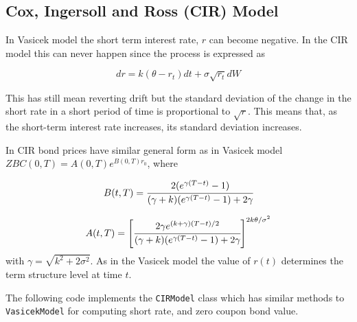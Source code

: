 \subsection{Cox, Ingersoll and Ross (CIR) Model}
\label{cox-ingersoll-and-ross-cir-model}

In Vasicek model the short term interest rate, $r$ can become negative. In the CIR model this can never happen since the process is expressed as

\begin{equation}
dr = k(\theta - r_t)dt + \sigma\sqrt{r_t}dW
\label{eq:cir_process}
\end{equation}

This has still mean reverting drift but the standard deviation of the change in the short rate in a short period of time is proportional to $\sqrt{r}$. This means that, as the short-term interest rate increases, its standard deviation increases.

In CIR bond prices have similar general form as in Vasicek model $ZBC(0, T)=A(0, T)e^{B(0, T)r_0}$, where

\begin{equation}
B(t, T) = \cfrac{2(e^{\gamma(T-t)}-1)}{(\gamma+k)(e^{\gamma(T-t)}-1)+2\gamma}
\label{eq:cir_B_param}
\end{equation}

\begin{equation}
A(t, T) = \left[\cfrac{2\gamma e^{(k+\gamma)(T-t)/2}}{(\gamma+k)(e^{\gamma(T-t)}-1)+2\gamma}\right]^{2k\theta /\sigma^2}
\label{eq:cir_A_param}
\end{equation}
with $\gamma = \sqrt {k^2 + 2\sigma^2}$. As in the Vasicek model the value of $r(t)$ determines the term structure level at time $t$.

\begin{finmarkets}
The following code implements the \texttt{CIRModel} class which has similar methods to \texttt{VasicekModel} for computing short rate, and zero coupon bond value.
\end{finmarkets}

